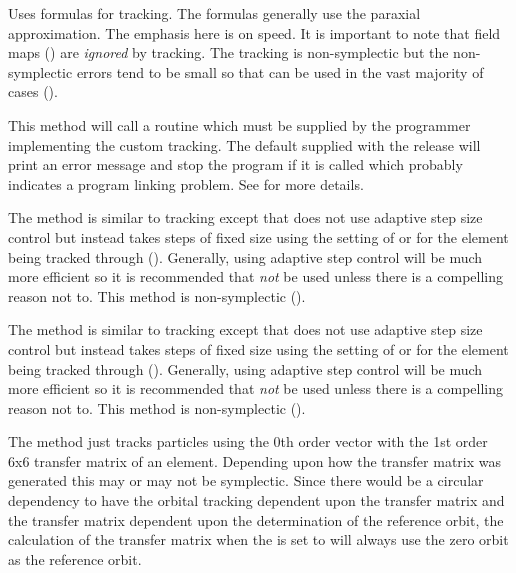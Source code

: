 \begin{description}

\item[\vn{Bmad_Standard}]
Uses formulas for tracking. The formulas generally use the paraxial approximation. The emphasis here
is on speed. It is important to note that field maps () are {\em ignored} by
 tracking. The tracking is non-symplectic but the non-symplectic errors tend to
be small so that  can be used in the vast majority of cases ().

\item[\vn{Custom}]
This method will call a routine  which must be supplied by the programmer
implementing the custom tracking. The default  supplied with the \bmad release
will print an error message and stop the program if it is called which probably indicates a program
linking problem. See  for more details.

\item[\vn{fixed_step_runge_kutta}]
The  method is similar to  tracking except that
 does not use adaptive step size control but instead takes steps of fixed
size using the setting of  or  for the element being tracked through
().  Generally, using adaptive step control will be much more efficient so it is
recommended that  {\em not} be used unless there is a compelling reason
not to. This method is non-symplectic ().

\item[\vn{fixed_step_time_runge_kutta}]
The  method is similar to  tracking except that
 does not use adaptive step size control but instead takes steps of
fixed size using the setting of  or  for the element being tracked through
().  Generally, using adaptive step control will be much more efficient so it is
recommended that  {\em not} be used unless there is a compelling
reason not to. This method is non-symplectic ().

\item[\vn{Linear}]
The  method just tracks particles using the 0th order vector with the 1st order 6x6
transfer matrix of an element. Depending upon how the transfer matrix was generated this may or may
not be symplectic. Since there would be a circular dependency to have the orbital tracking dependent
upon the transfer matrix and the transfer matrix dependent upon the determination of the reference
orbit, the calculation of the transfer matrix when the  is set to 
will always use the zero orbit as the reference orbit.


\end{description}
